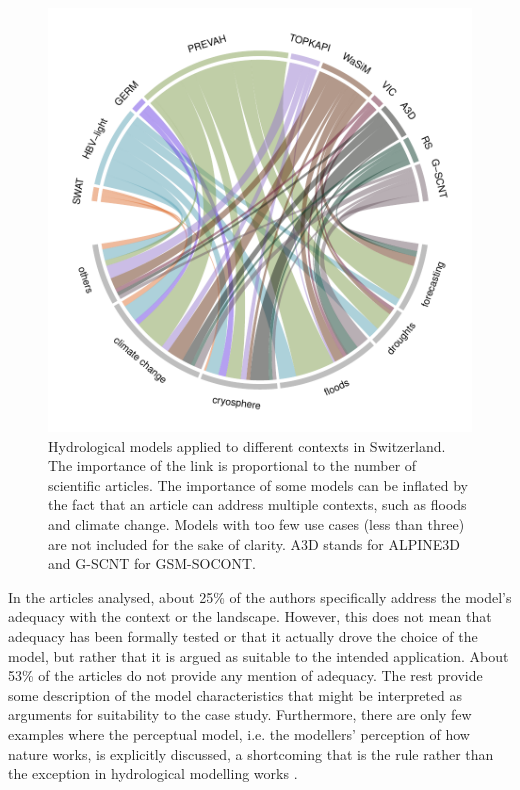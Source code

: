 \documentclass[10pt,a4paper]{article}
\begin{document}
\begin{figure}[htb]
	\begin{center}
		\includegraphics[width=0.70\columnwidth]{figures/chord_diagram_contexts}
		\caption{{Hydrological models applied to different contexts in Switzerland. The importance of the link is proportional to the number of scientific articles. The importance of some models can be inflated by the fact that an article can address multiple contexts, such as floods and climate change. Models with too few use cases (less than three) are not included for the sake of clarity. A3D stands for ALPINE3D and G-SCNT for GSM-SOCONT. 
		{\label{fig:applications}}
		}}
	\end{center}
\end{figure}

In the articles analysed, about 25\% of the authors specifically address the model's adequacy with the context or the landscape. However, this does not mean that adequacy has been formally tested or that it actually drove the choice of the model, but rather that it is argued as suitable to the intended application. About 53\% of the articles do not provide any mention of adequacy. The rest provide some description of the model characteristics that might be interpreted as arguments for suitability to the case study. Furthermore, there are only few examples where the perceptual model, i.e. the modellers' perception of how nature works, is explicitly discussed, a shortcoming that is the rule rather than the exception in hydrological modelling works \citep{Beven2021}.
\end{document}
